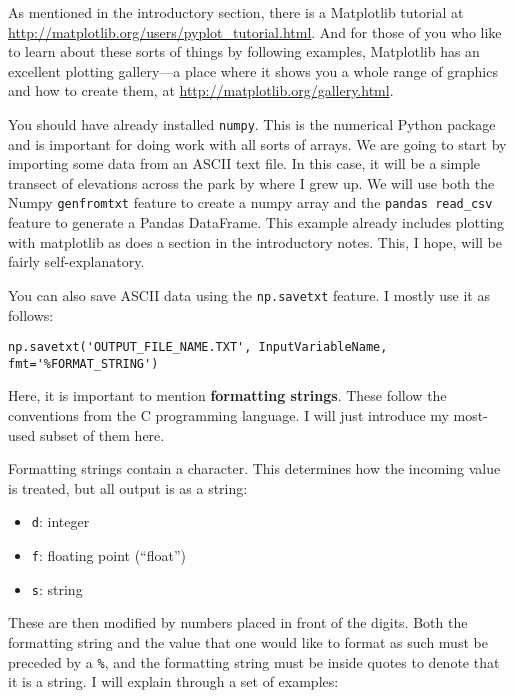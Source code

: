 \documentclass[a4paper,10pt]{scrartcl}
\begin{document}
\begin{framed}
As mentioned in the introductory section, there is a Matplotlib tutorial at \url{http://matplotlib.org/users/pyplot_tutorial.html}. And for those of you who like to learn about these sorts of things by following examples, Matplotlib has an excellent plotting gallery---a place where it shows you a whole range of graphics and how to create them, at \url{http://matplotlib.org/gallery.html}.
\end{framed}

You should have already installed \lstinline{numpy}. This is the numerical Python package and is important for doing work with all sorts of arrays. We are going to start by importing some data from an ASCII text file. In this case, it will be a simple transect of elevations across the park by where I grew up. We will use both the Numpy \lstinline{genfromtxt} feature to create a numpy array and the \lstinline{pandas read_csv} feature to generate a Pandas DataFrame. This example already includes plotting with matplotlib as does a section in the introductory notes. This, I hope, will be fairly self-explanatory.



You can also save ASCII data using the \lstinline{np.savetxt} feature. I mostly use it as follows:
\begin{lstlisting}
np.savetxt('OUTPUT_FILE_NAME.TXT', InputVariableName, fmt='%FORMAT_STRING')
\end{lstlisting}

Here, it is important to mention \textbf{formatting strings}. These follow the conventions from the C programming language. I will just introduce my most-used subset of them here.

Formatting strings contain a character. This determines how the incoming value is treated, but all output is as a string:
\begin{itemize}
 \item \lstinline{d}: integer
 \item \lstinline{f}: floating point (``float'')
 \item \lstinline{s}: string
\end{itemize}

These are then modified by numbers placed in front of the digits. Both the formatting string and the value that one would like to format as such must be preceded by a \lstinline{%}, and the formatting string must be inside quotes to denote that it is a string. I will explain through a set of examples:
\end{document}
